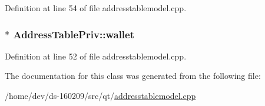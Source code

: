 Definition at line 54 of file addresstablemodel.\+cpp.

\hypertarget{class_address_table_priv_ad3506d642e5546251e76fbf0d75b2aca}{}
\subsubsection[{wallet}]{$\ast$ Address\+Table\+Priv\+::wallet}\label{class_address_table_priv_ad3506d642e5546251e76fbf0d75b2aca}


Definition at line 52 of file addresstablemodel.\+cpp.



The documentation for this class was generated from the following file\+:\begin{DoxyCompactItemize}
\item 
/home/dev/ds-\/160209/src/qt/\hyperlink{addresstablemodel_8cpp}{addresstablemodel.\+cpp}\end{DoxyCompactItemize}
